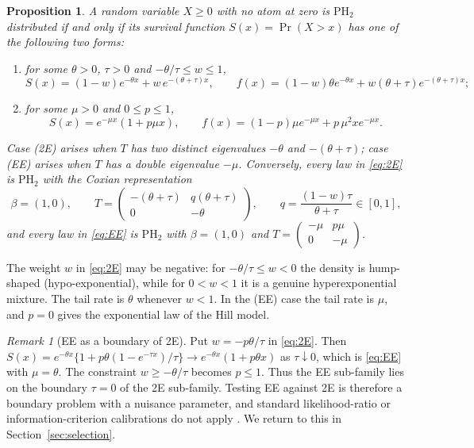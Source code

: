\documentclass[12pt]{article}
\newtheorem{proposition}[theorem]{Proposition}
\theoremstyle{definition}
\theoremstyle{remark}
\newtheorem{remark}[theorem]{Remark}
\newcommand{\PH}{\mathrm{PH}}
\begin{document}
\begin{proposition}\label{prop:ph2}
A random variable $X\ge 0$ with no atom at zero is $\PH_2$ distributed if and only if its survival function $S(x)=\Pr(X>x)$ has one of the following two forms:
\begin{enumerate}
\item[\textup{(2E)}] for some $\theta>0$, $\tau>0$ and $-\theta/\tau\le w\le 1$,
\begin{equation}\label{eq:2E}
S(x)=(1-w)e^{-\theta x}+w\,e^{-(\theta+\tau)x},\qquad f(x)=(1-w)\theta e^{-\theta x}+w(\theta+\tau)e^{-(\theta+\tau)x};
\end{equation}
\item[\textup{(EE)}] for some $\mu>0$ and $0\le p\le 1$,
\begin{equation}\label{eq:EE}
S(x)=e^{-\mu x}(1+p\mu x),\qquad f(x)=(1-p)\mu e^{-\mu x}+p\,\mu^2xe^{-\mu x}.
\end{equation}
\end{enumerate}
Case \textup{(2E)} arises when $T$ has two distinct eigenvalues $-\theta$ and $-(\theta+\tau)$; case \textup{(EE)} arises when $T$ has a double eigenvalue $-\mu$. Conversely, every law in \eqref{eq:2E} is $\PH_2$ with the Coxian representation
\begin{equation}\label{eq:cox2E}
\beta=(1,0),\qquad T=\begin{pmatrix}-(\theta+\tau) & q(\theta+\tau)\\ 0 & -\theta\end{pmatrix},\qquad q=\frac{(1-w)\tau}{\theta+\tau}\in[0,1],
\end{equation}
and every law in \eqref{eq:EE} is $\PH_2$ with $\beta=(1,0)$ and $T=\begin{pmatrix}-\mu & p\mu\\ 0&-\mu\end{pmatrix}$.
\end{proposition}

The weight $w$ in \eqref{eq:2E} may be negative: for $-\theta/\tau\le w<0$ the density is hump-shaped (hypo-exponential), while for $0<w<1$ it is a genuine hyperexponential mixture. The tail rate is $\theta$ whenever $w<1$. In the (EE) case the tail rate is $\mu$, and $p=0$ gives the exponential law of the Hill model.

\begin{remark}[EE as a boundary of 2E]\label{rem:limit}
Put $w=-p\theta/\tau$ in \eqref{eq:2E}. Then $S(x)=e^{-\theta x}\{1+p\theta(1-e^{-\tau x})/\tau\}\to e^{-\theta x}(1+p\theta x)$ as $\tau\downarrow 0$, which is \eqref{eq:EE} with $\mu=\theta$. The constraint $w\ge-\theta/\tau$ becomes $p\le 1$. Thus the EE sub-family lies on the boundary $\tau=0$ of the 2E sub-family. Testing EE against 2E is therefore a boundary problem with a nuisance parameter, and standard likelihood-ratio or information-criterion calibrations do not apply \citep{SelfLiang1987}. We return to this in Section~\ref{sec:selection}.
\end{remark}
\end{document}
